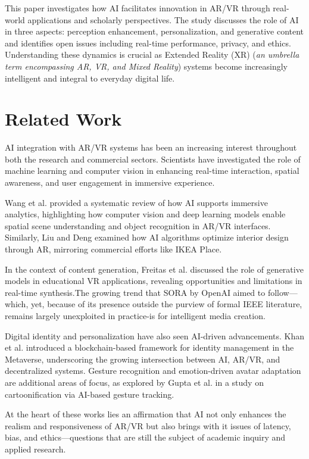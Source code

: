 \documentclass[conference]{IEEEtran}
\begin{document}
This paper investigates how AI facilitates innovation in AR/VR through real-world applications and scholarly perspectives. The study discusses the role of AI in three aspects: perception enhancement, personalization, and generative content and identifies open issues including real-time performance, privacy, and ethics. Understanding these dynamics is crucial as Extended Reality (XR) (\textit{an umbrella term encompassing AR, VR, and Mixed Reality}) systems become increasingly intelligent and integral to everyday digital life.

\section{Related Work}
AI integration with AR/VR systems has been an increasing interest throughout both the research and commercial sectors. Scientists have investigated the role of machine learning and computer vision in enhancing real-time interaction, spatial awareness, and user engagement in immersive experience.

Wang et al. \cite{Wang2025} provided a systematic review of how AI supports immersive analytics, highlighting how computer vision and deep learning models enable spatial scene understanding and object recognition in AR/VR interfaces. Similarly, Liu and Deng \cite{Liu2025} examined how AI algorithms optimize interior design through AR, mirroring commercial efforts like IKEA Place.

In the context of content generation, Freitas et al. \cite{Freitas2025} discussed the role of generative models in educational VR applications, revealing opportunities and limitations in real-time synthesis.The growing trend that SORA by OpenAI aimed to follow—which, yet, because of its  presence outside the purview of formal IEEE literature, remains largely unexploited in practice-is for intelligent media creation.

Digital identity and personalization have also seen AI-driven advancements. Khan et al. \cite{Khan2025} introduced a blockchain-based framework for identity management in the Metaverse, underscoring the growing intersection between AI, AR/VR, and decentralized systems. Gesture recognition and emotion-driven avatar adaptation are additional areas of focus, as explored by Gupta et al. \cite{Gupta2025} in a study on cartoonification via AI-based gesture tracking.

At the heart of these works lies an affirmation that AI not only enhances the realism and responsiveness of AR/VR but also brings with it issues of latency, bias, and ethics—questions that are still the subject of academic inquiry and applied research.
\end{document}
